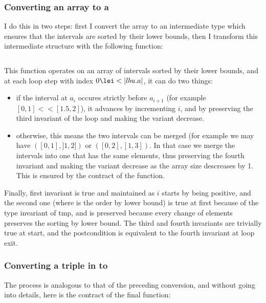\subsubsection{Converting an array to a }

I do this in two steps: first I convert the array to an intermediate type
 which ensures that the intervals are sorted by their lower
bounds, then I transform this intermediate structure with the following function:
%
\inputminted{\whyml}{why3code/lax_to_strict.mlw}
%

This function operates on an array of intervals sorted by their lower bounds, and at
each loop step with index $0\lei < |lbu.a|$, it can do two things:
\begin{itemize}
  \item if the interval at $a_i$ occures strictly before $a_{i+1}$ (for example
    $[0,1] << [1.5,2]$), it advances by incrementing $i$, and by preserving the
    third invariant of the loop and making the variant decrease.
  \item otherwise, this means the two intervals can be merged (for example we may
    have $([0,1],]1,2])$ or $([0,2],[1,3])$. In that case we merge the intervals into
    one that has the same elements, thus preserving the fourth invariant and making
    the variant decrease as the array size descreases by 1.
    This is ensured by the contract of the  function.
\end{itemize}
Finally, first invariant is true and maintained as $i$ starts by being positive, and
the second one (where \minline{<==} is the order by lower bound) is true at first
because of the type invariant of tmp, and is preserved because every change of
elements preserves the sorting by lower bound. The third and fourth invariants are
trivially true at start, and the postcondition is equivalent to the fourth invariant
at loop exit.


\subsubsection{Converting a triple in 
  to }
The process is analogous to that of the preceding conversion, and without going into
details, here is the contract of the final function:
%
\inputminted{\whyml}{why3code/fix_untyped.mlw}
